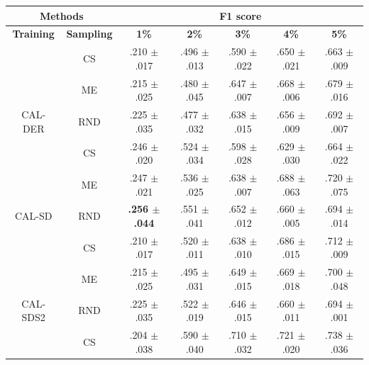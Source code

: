 \begin{table}[htbp]
\centering

\begin{tabular*}{\linewidth}{c|c|@{\extracolsep{\fill}}ccccc}
\toprule
\multicolumn{2}{c|}{\textbf{Methods}} & \multicolumn{5}{c}{\textbf{F1 score}} \\
\midrule
\textbf{Training} & \textbf{Sampling} & \textbf{1\%} & \textbf{2\%} & \textbf{3\%} & \textbf{4\%} & \textbf{5\%}\\
\midrule
 & CS & .210 $\pm$ {\small .017} & .496 $\pm$ {\small .013} & .590 $\pm$ {\small .022} & .650 $\pm$ {\small .021} & .663 $\pm$ {\small .009}\\

 & ME & .215 $\pm$ {\small .025} & .480 $\pm$ {\small .045} & .647 $\pm$ {\small .007} & .668 $\pm$ {\small .006} & .679 $\pm$ {\small .016}\\

\multirow{-3}{*}{\raggedright\arraybackslash CAL-DER} & RND & .225 $\pm$ {\small .035} & .477 $\pm$ {\small .032} & .638 $\pm$ {\small .015} & .656 $\pm$ {\small .009} & .692 $\pm$ {\small .007}\\
\midrule
 & CS & .246 $\pm$ {\small .020} & .524 $\pm$ {\small .034} & .598 $\pm$ {\small .028} & .629 $\pm$ {\small .030} & .664 $\pm$ {\small .022}\\

 & ME & .247 $\pm$ {\small .021} & .536 $\pm$ {\small .025} & .638 $\pm$ {\small .007} & .688 $\pm$ {\small .063} & .720 $\pm$ {\small .075}\\

\multirow{-3}{*}{\raggedright\arraybackslash CAL-SD} & RND & \textbf{.256 $\pm$ {\small .044}} & .551 $\pm$ {\small .041} & .652 $\pm$ {\small .012} & .660 $\pm$ {\small .005} & .694 $\pm$ {\small .014}\\
\midrule
 & CS & .210 $\pm$ {\small .017} & .520 $\pm$ {\small .011} & .638 $\pm$ {\small .010} & .686 $\pm$ {\small .015} & .712 $\pm$ {\small .009}\\

 & ME & .215 $\pm$ {\small .025} & .495 $\pm$ {\small .031} & .649 $\pm$ {\small .015} & .669 $\pm$ {\small .018} & .700 $\pm$ {\small .048}\\

\multirow{-3}{*}{\raggedright\arraybackslash CAL-SDS2} & RND & .225 $\pm$ {\small .035} & .522 $\pm$ {\small .019} & .646 $\pm$ {\small .015} & .660 $\pm$ {\small .011} & .694 $\pm$ {\small .001}\\
\midrule
 & CS & .204 $\pm$ {\small .038} & .590 $\pm$ {\small .040} & .710 $\pm$ {\small .032} & .721 $\pm$ {\small .020} & .738 $\pm$ {\small .036}\\


\end{tabular*}
\end{table}
